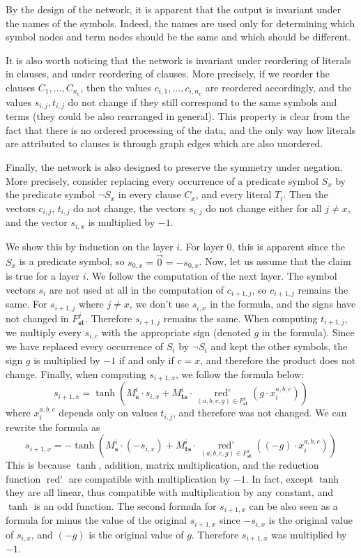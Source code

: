 \documentclass{ecai}
\newcommand{\redd}{\mathop{\mathrm{red'}}\limits}
\newcommand{\nbc}[3]{
                {\colorbox{#3}{\bfseries\sffamily\scriptsize\textcolor{white}{#1}}}
                {\textcolor{#3}{\sffamily\small$\blacktriangleright$\textit{#2}$\blacktriangleleft$}}
}
\newcommand{\todoat}[2]{\nbc{TODO: #1}{#2}{todocolor}}
\begin{document}
By the design of the network, it is apparent that the output is
invariant under the names of the symbols. Indeed, the names are used only
for determining which symbol nodes and term nodes should be the same
and which should be different.

It is also worth noticing that the network is invariant under
reordering of literals in clauses, and under reordering of clauses.
More precisely, if we reorder the clauses
$C_1, \ldots, C_{n_{\mathbf c}}$, then the values
$c_{i,1}, \ldots, c_{i,n_{\mathbf c}}$ are reordered accordingly, and
the values $s_{i,j}, t_{i,j}$ do not change if they still correspond
to the same symbols and terms (they could be also rearranged in
general). This property is clear from the fact that there is no
ordered processing of the data, and the only way how literals are
attributed to clauses is through graph edges which are also unordered.

Finally, the network is also designed to preserve the symmetry under
negation. More precisely, consider replacing every occurrence of a predicate
symbol $S_x$ by the predicate symbol $\neg S_x$ in every clause $C_x$,
and every literal $T_i$. Then the vectors $c_{i,j}$, $t_{i,j}$ do not
change, the vectors 
$s_{i,j}$ do not change either for all
$j \neq x$, and the vector $s_{i,x}$ is multiplied by $-1$.

We show this by induction on the layer $i$. For layer $0$,
this is apparent since the $S_x$ is a predicate symbol, so
$s_{0,x} = \vec 0 = -s_{0,x}$.
Now, let us assume that the claim is true for a layer $i$. 
We follow the computation of the next layer. The symbol
vectors $s_i$ are not used at all in the computation of $c_{i+1,j}$,
so $c_{i+1,j}$ remains the same. For $s_{i+1,j}$ where $j\neq x$, we
don't use $s_{i,x}$ in the formula, and the signs have not changed in
$F^j_{\mathbf{st}}$. Therefore $s_{i+1,j}$ remains the same.
When computing $t_{i+1,j}$, we multiply every $s_{i,c}$ with the
appropriate sign (denoted $g$ in the formula). Since we have replaced every
occurrence of $S_i$ by $\neg S_i$ and kept the other symbols,
the sign $g$ is multiplied by $-1$ if and only if $c = x$, and
therefore the product does not change.
Finally, when computing $s_{i+1,x}$, we follow the formula below:
$$
s_{i+1,x} = \tanh(
  M^i_{\mathbf s}\cdot s_{i,x} +
  M^i_{\mathbf{ts}}\cdot\redd_{(a,b,c,g)\in
  F^x_{\mathbf{st}}}(g\cdot x_{i}^{a,b,c})
)
$$
where $x_{i}^{a,b,c}$ depends only on values $t_{i,j}$, and therefore
was not changed. We can rewrite the formula as
$$
s_{i+1,x} = -\tanh(
  M^i_{\mathbf s}\cdot (-s_{i,x}) +
  M^i_{\mathbf{ts}}\cdot\redd_{(a,b,c,g)\in
  F^x_{\mathbf{st}}}((-g)\cdot x_{i}^{a,b,c})
)
$$
This is because $\tanh$, addition, matrix multiplication, and the
reduction function $\redd$ are compatible with multiplication by $-1$.
In fact, except $\tanh$ they are all linear, thus compatible with
multiplication by any constant, and $\tanh$ is an odd function.
The second formula for $s_{i+1,x}$ can be also seen as a formula
for minus the value of the
original $s_{i+1,x}$ since $-s_{i,x}$ is the original value of
$s_{i,x}$, and $(-g)$ is the original value of $g$. Therefore
$s_{i+1,x}$ was multiplied by $-1$.
\end{document}

